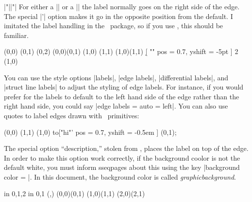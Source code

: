 \begin{sseqdata}[|| name = ex1, cohomological Serre grading]
\begin{manualentry}{|"||"|}
For either a |\structline| or a |\class| the label normally goes on the right side of the edge. The special |'| option makes it go in the opposite position from the default. I imitated the label handling in the \tikzcdpkg\ package, so if you use \tikzcdpkg, this should be familiar.
\begin{codeexample}[width = 6cm]
\begin{sseqpage}[ Adams grading, yscale = 0.63 ]
\class(0,0)
\class(0,1)
\class(0,2)
\structline["a"' blue](0,0)(0,1)
\class(1,0)
\class(1,1)
\structline["b"](1,0)(1,1)
\d[ "" { pos = 0.7, yshift = -5pt } ] 2 (1,0)
\end{sseqpage}
\end{codeexample}
You can use the style options |labels|, |edge labels|, |differential labels|, and |struct line labels| to adjust the styling of edge labels. For instance, if you would prefer for the labels to default to the left hand side of the edge rather than the right hand side, you could say |edge labels = {auto = left}|.
You can also use quotes to label edges drawn with \tikzpkg\ primitives:
\begin{codeexample}[width = 6cm]
\begin{sseqpage}[ yscale = 0.58, no axes ]
\class(0,0)
\class(1,1)
\draw (1,0) to["hi"'{ pos = 0.7, yshift = -0.5em }] (0,1);
\end{sseqpage}
\end{codeexample}
The special option ``description,'' stolen from \tikzcdpkg, places the label on top of the edge. In order to make this option work correctly, if the background coolor is not the default white, you must inform sseqpages about this using the key |background color = |. In this document, the background color is called \textit{graphicbackground}.
\begin{codeexample}[width = 6cm]
\begin{sseqpage}[ no axes, background color = graphicbackground ]
\foreach \x in {0,1,2} \foreach \y in {0,1} {
    \class(\x,\y)
}
\structline["a" red](0,0)(0,1)
\structline["a'"'blue,"b"{yshift = 1em}](1,0)(1,1)
\structline["c" description](2,0)(2,1)
\end{sseqpage}
\end{codeexample}
\end{manualentry}




\end{sseqdata}
